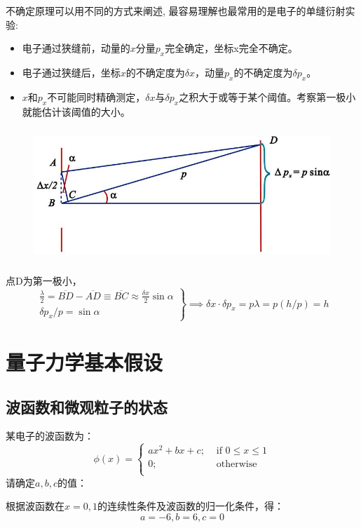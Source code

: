 不确定原理可以用不同的方式来阐述, 最容易理解也最常用的是电子的单缝衍射实验:
\begin{itemize}
\item 电子通过狭缝前，动量的$x$分量$p_x$完全确定，坐标x完全不确定。
\item 电子通过狭缝后，坐标$x$的不确定度为$\delta x$，动量$p_x$的不确定度为$\delta p_x$。
\item $x$和$p_x$不可能同时精确测定，$\delta x$与$\delta p_x$之积大于或等于某个阈值。考察第一极小就能估计该阈值的大小。
\end{itemize}

\begin{figure}[!ht]
\centering
\includegraphics[height=5cm]{pic/uncertianty.jpg}
\end{figure}

点D为第一极小，
\begin{equation*}
\left.
\begin{array}{r}
\frac{\lambda}{2} = \overline{BD} - \overline{AD} \equiv \overline{BC} \approx \frac{\delta x}{2} \sin \alpha \\
\delta p_x / p = \sin \alpha
\end{array}
\right\} \implies \delta x \cdot \delta p_x = p\lambda = p(h/p) = h
\end{equation*}





\section{量子力学基本假设}

\subsection{波函数和微观粒子的状态}

\begin{exT}
某电子的波函数为：
\begin{equation*}
\phi(x) = \left\{
\begin{aligned}
ax^2+bx+c; & \text{ if } 0\le x \le 1\\
0; & \text{ otherwise}\\
\end{aligned}
\right.
\end{equation*}
请确定$a,b,c$的值：\\

\end{exT}
\begin{soluT}
根据波函数在$x=0,1$的连续性条件及波函数的归一化条件，得：
$$a=-6, b=6, c=0$$
\end{soluT}


